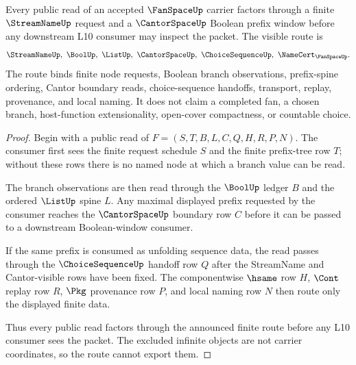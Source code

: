 \begin{theorem}
\label{thm:fan-space-streamname-cantor-scope}
Every public read of an accepted $\FanSpaceUp$ carrier factors through a
finite $\StreamNameUp$ request and a $\CantorSpaceUp$ Boolean prefix window
before any downstream L10 consumer may inspect the packet. The visible route is
$$
\StreamNameUp,\ \BoolUp,\ \ListUp,\ \CantorSpaceUp,\ \ChoiceSequenceUp,\
\NameCert_{\FanSpaceUp}.
$$
The route binds finite node requests, Boolean branch observations, prefix-spine
ordering, Cantor boundary reads, choice-sequence handoffs, transport, replay,
provenance, and local naming. It does not claim a completed fan, a chosen
branch, host-function extensionality, open-cover compactness, or countable
choice.
\end{theorem}
\begin{proof}
Begin with a public read of $F=(S,T,B,L,C,Q,H,R,P,N)$. The consumer first sees
the finite request schedule $S$ and the finite prefix-tree row $T$; without
these rows there is no named node at which a branch value can be read.

The branch observations are then read through the $\BoolUp$ ledger $B$ and the
ordered $\ListUp$ spine $L$. Any maximal displayed prefix requested by the
consumer reaches the $\CantorSpaceUp$ boundary row $C$ before it can be passed
to a downstream Boolean-window consumer.

If the same prefix is consumed as unfolding sequence data, the read passes
through the $\ChoiceSequenceUp$ handoff row $Q$ after the StreamName and
Cantor-visible rows have been fixed. The componentwise $\hsame$ row $H$,
$\Cont$ replay row $R$, $\Pkg$ provenance row $P$, and local naming row $N$
then route only the displayed finite data.

Thus every public read factors through the announced finite route before any
L10 consumer sees the packet. The excluded infinite objects are not carrier
coordinates, so the route cannot export them.
\end{proof}

